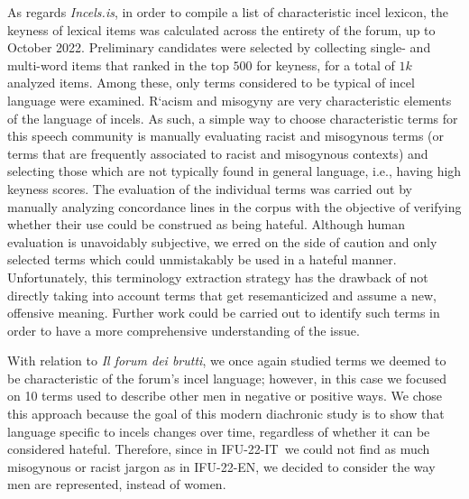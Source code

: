 \documentclass[11pt]{article}
\newcommand{\dsENcorpus}{IFU-22-EN}
\newcommand{\dsITcorpus}{IFU-22-IT}
\newcommand{\enforum}{\textit{Incels.is}}
\newcommand{\itforum}{\textit{Il forum dei brutti}}
\begin{document}
As regards \enforum, in order to compile a list of characteristic incel lexicon, the keyness of lexical items was calculated across the entirety of the forum, up to October 2022. Preliminary candidates were selected by 
collecting single- and multi-word items that ranked in the top $500$ for keyness, for a total of $1k$ analyzed items.  Among these, only terms considered to be typical of incel language were examined. R`acism and misogyny are very characteristic elements of the language of incels. As such, a simple way to choose characteristic terms for this speech community is manually evaluating racist and misogynous terms (or terms that are frequently associated to racist and misogynous contexts) and selecting those which are not typically found in general language, i.e., having high keyness scores.
The evaluation of the individual terms was carried out by manually analyzing concordance lines in the corpus with the objective of verifying whether their use could be construed as being hateful. Although human evaluation is unavoidably subjective, we erred on the side of caution and only selected terms which could unmistakably be used in a hateful manner. Unfortunately, this terminology extraction strategy has the drawback of not directly taking into account terms that get resemanticized and assume a new, offensive meaning. Further work could be carried out to identify such terms in order to have a more comprehensive understanding of the issue.

With relation to \itforum, we once again studied terms we deemed to be characteristic of the forum's incel language; however, in this case we focused on 10 terms used to describe other men in negative or positive ways. We chose this approach because the goal of this modern diachronic study is to show that language specific to incels changes over time, regardless of whether it can be considered hateful. Therefore, since in \dsITcorpus\, we could not find as much misogynous or racist jargon as in \dsENcorpus, we decided to consider the way men are represented, instead of women.

\end{document}
